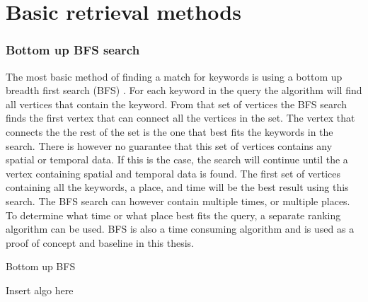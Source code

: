 
\chapter{Basic retrieval methods}

\subsection{Bottom up BFS search}
The most basic method of finding a match for keywords is using a bottom up breadth first search (BFS) \cite{He:2007:BRK:1247480.1247516}. For each keyword in the query the algorithm will find all vertices that contain the keyword. From that set of vertices the BFS search finds the first vertex that can connect all the vertices in the set. The vertex that connects the the rest of the set is the one that best fits the keywords in the search. There is however no guarantee that this set of vertices contains any spatial or temporal data. If this is the case, the search will continue until the a vertex containing spatial and temporal data is found. The first set of vertices containing all the keywords, a place, and time will be the best result using this search. The BFS search can however contain multiple times, or multiple places. To determine what time or what place best fits the query, a separate ranking algorithm can be used. BFS is also a time consuming algorithm and is used as a proof of concept and baseline in this thesis.

\begin{algorithm}
\caption{Bottom up BFS}
\begin{algorithmic}[1]
Insert algo here


\EndProcedure
\end{algorithmic}
\end{algorithm}

\cleardoublepage